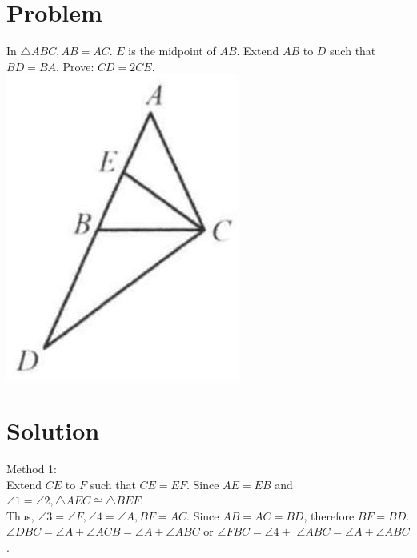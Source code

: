 \documentclass{article}
\begin{document}
\section*{Problem}
In \(\triangle A B C, A B=A C\). \(E\) is the midpoint of \(A B\). Extend \(A B\) to \(D\) such that \(B D=B A\). Prove: \(C D=2 C E\).\\
\centering
\includegraphics[width=\textwidth]{images/027(1).jpg}

\section*{Solution}
Method 1:\\
Extend \(C E\) to \(F\) such that \(C E=E F\). Since \(A E=E B\) and \(\angle 1=\angle 2, \triangle A E C \cong \triangle B E F\).\\
Thus, \(\angle 3=\angle F, \angle 4=\angle A, B F=A C\). Since \(A B=A C=B D\), therefore \(B F=B D\). \(\angle D B C=\angle A+\angle A C B=\angle A+\angle A B C\) or \(\angle F B C=\angle 4+\) \(\angle A B C=\angle A+\angle A B C\).
\end{document}
